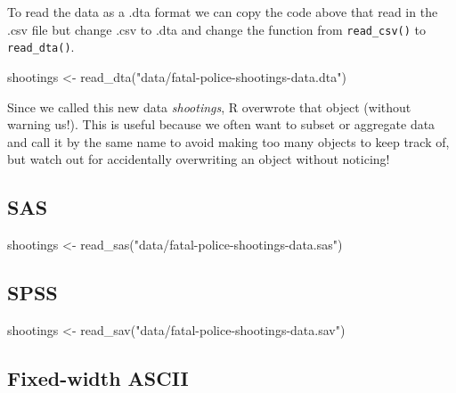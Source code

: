 \documentclass[
]{krantz}
\makeatletter
\newenvironment{Shaded}{\begin{snugshade}}{\end{snugshade}}
\newcommand{\FunctionTok}[1]{\textcolor[rgb]{0,0,0}{#1}}
\newcommand{\NormalTok}[1]{#1}
\newcommand{\OtherTok}[1]{\textcolor[rgb]{0.37,0.37,0.37}{#1}}
\newcommand{\StringTok}[1]{\textcolor[rgb]{0.5,0.5,0.5}{#1}}
\newenvironment{kframe}{%
\medskip{}
\setlength{\fboxsep}{.8em}
 \def\at@end@of@kframe{}%
 \ifinner\ifhmode%
  \def\at@end@of@kframe{\end{minipage}}%
  \begin{minipage}{\columnwidth}%
 \fi\fi%
 \def\FrameCommand##1{\hskip\@totalleftmargin \hskip-\fboxsep
 \colorbox{shadecolor}{##1}\hskip-\fboxsep
     \hskip-\linewidth \hskip-\@totalleftmargin \hskip\columnwidth}%
 \MakeFramed {\advance\hsize-\width
   \@totalleftmargin\z@ \linewidth\hsize
   \@setminipage}}%
 {\par\unskip\endMakeFramed%
 \at@end@of@kframe}
\renewenvironment{Shaded}{\begin{kframe}}{\end{kframe}}
\makeatother
\begin{document}
To read the data as a .dta format we can copy the code above
that read in the .csv file but change .csv to .dta and
change the function from \texttt{read\_csv()} to
\texttt{read\_dta()}.

\begin{Shaded}
\begin{Highlighting}[]
\NormalTok{shootings }\OtherTok{\textless{}{-}} \FunctionTok{read\_dta}\NormalTok{(}\StringTok{"data/fatal{-}police{-}shootings{-}data.dta"}\NormalTok{)}
\end{Highlighting}
\end{Shaded}

Since we called this new data \emph{shootings}, R overwrote
that object (without warning us!). This is useful because we
often want to subset or aggregate data and call it by the
same name to avoid making too many objects to keep track of,
but watch out for accidentally overwriting an object without
noticing!

\hypertarget{sas}{%
\subsection{SAS}\label{sas}}

\begin{Shaded}
\begin{Highlighting}[]
\NormalTok{shootings }\OtherTok{\textless{}{-}} \FunctionTok{read\_sas}\NormalTok{(}\StringTok{"data/fatal{-}police{-}shootings{-}data.sas"}\NormalTok{)}
\end{Highlighting}
\end{Shaded}

\hypertarget{spss}{%
\subsection{SPSS}\label{spss}}

\begin{Shaded}
\begin{Highlighting}[]
\NormalTok{shootings }\OtherTok{\textless{}{-}} \FunctionTok{read\_sav}\NormalTok{(}\StringTok{"data/fatal{-}police{-}shootings{-}data.sav"}\NormalTok{)}
\end{Highlighting}
\end{Shaded}

\hypertarget{fixed-width-ascii}{%
\subsection{Fixed-width ASCII}\label{fixed-width-ascii}}
\end{document}
